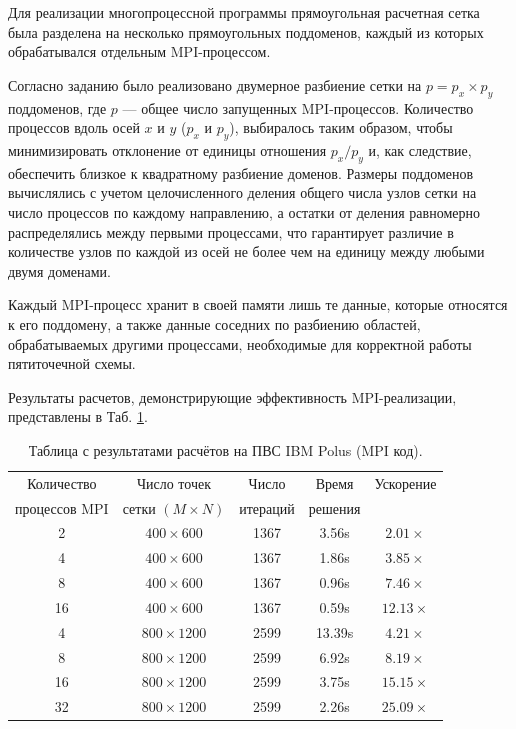 \documentclass[12pt,a4paper]{article}
\begin{document}
    Для реализации многопроцессной программы прямоугольная расчетная сетка была разделена на несколько прямоугольных поддоменов, каждый из которых обрабатывался отдельным MPI-процессом.

    Согласно заданию было реализовано двумерное разбиение сетки на \(p = p_x \times p_y\) поддоменов, где \(p\) — общее число запущенных MPI-процессов. Количество процессов вдоль осей \(x\) и \(y\) (\(p_x\) и \(p_y\)), выбиралось таким образом, чтобы минимизировать отклонение от единицы отношения \(p_x / p_y\) и, как следствие, обеспечить близкое к квадратному разбиение доменов. Размеры поддоменов вычислялись с учетом целочисленного деления общего числа узлов сетки на число процессов по каждому направлению, а остатки от деления равномерно распределялись между первыми процессами, что гарантирует различие в количестве узлов по каждой из осей не более чем на единицу между любыми двумя доменами.

    Каждый MPI-процесс хранит в своей памяти лишь те данные, которые относятся к его поддомену, а также данные соседних по разбиению областей, обрабатываемых другими процессами, необходимые для корректной работы пятиточечной схемы.

    Результаты расчетов, демонстрирующие эффективность MPI-реализации, представлены в Таб. \ref{tab:mpi}.

    \begin{table}[h!]
        \centering
        \begin{tabular}{c|c|c|c|c}
            \hline
            Количество & Число точек & Число & Время & Ускорение \\
            процессов MPI & сетки $ (M \times N) $ & итераций & решения &  \\ \hline
            2  & $400 \times 600$ & 1367 & 3.56s & $2.01\times$ \\
            4  & $400 \times 600$ & 1367 & 1.86s & $3.85\times$ \\
            8  & $400 \times 600$ & 1367 & 0.96s & $7.46\times$ \\
            16 & $400 \times 600$ & 1367 & 0.59s & $12.13\times$ \\ \hline
            4  & $800 \times 1200$ & 2599 & 13.39s & $4.21\times$ \\
            8  & $800 \times 1200$ & 2599 & 6.92s & $8.19\times$ \\
            16 & $800 \times 1200$ & 2599 & 3.75s & $15.15\times$ \\
            32 & $800 \times 1200$ & 2599 & 2.26s & $25.09\times$ \\
        \end{tabular}
        \caption{Таблица с результатами расчётов на ПВС IBM Polus (MPI код).}
        \label{tab:mpi}
    \end{table}
\end{document}

